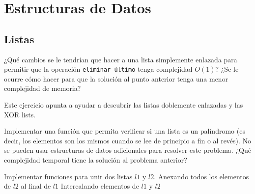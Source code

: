 \documentclass[titlepage,oneside]{book}
\newcommand{\ChatGPT}{\faIcon{robot}}
\begin{document}
\part{Estructuras de Datos}
\chapter{Listas}
\begin{Exercise}
	\Question ¿Qué cambios se le tendrían que hacer a una lista simplemente enlazada para permitir que la operación \texttt{eliminar último} tenga complejidad $O\left(1\right)$?
	\Question[difficulty=1] ¿Se le ocurre cómo hacer para que la solución al punto anterior tenga una menor complejidad de memoria?
\end{Exercise}
\begin{Answer}
		Este ejercicio apunta a ayudar a descubrir las listas doblemente enlazadas y las XOR lists.
\end{Answer}

\begin{Exercise}[origin=\ChatGPT]
	Implementar una función que permita verificar si una lista es un palíndromo (es decir, los elementos son los mismos cuando se lee de principio a fin o al revés). No se pueden usar estructuras de datos adicionales para resolver este problema.
	\Question ¿Qué complejidad temporal tiene la solución al problema anterior?
\end{Exercise}

\begin{Exercise}
	Implementar funciones para unir dos listas $l1$ y $l2$.
	\Question Anexando todos los elementos de $l2$ al final de $l1$
	\Question Intercalando elementos de $l1$ y $l2$
\end{Exercise}
\end{document}
